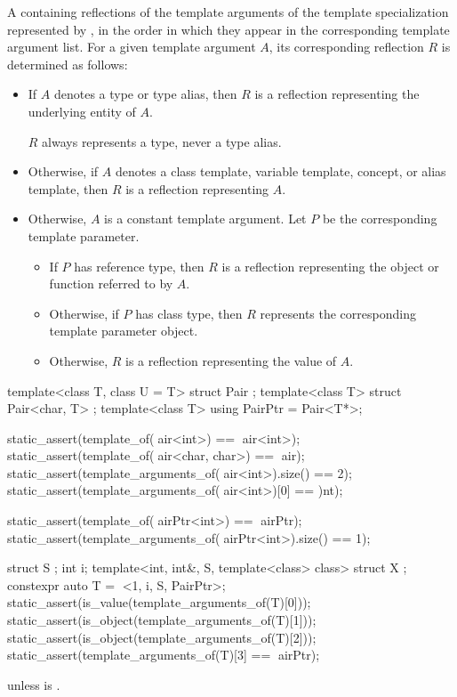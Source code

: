 \begin{itemdescr}
\pnum
\returns
A  containing reflections
of the template arguments
of the template specialization represented by ,
in the order in which they appear in the corresponding template argument list.
For a given template argument $A$,
its corresponding reflection $R$ is determined as follows:
\begin{itemize}
\item
  If $A$ denotes a type or type alias,
  then $R$ is a reflection representing the underlying entity of $A$.
  \begin{note}
  $R$ always represents a type, never a type alias.
  \end{note}
\item
  Otherwise, if $A$ denotes a
  class template,
  variable template,
  concept, or
  alias template,
  then $R$ is a reflection representing $A$.
\item
  Otherwise, $A$ is a constant template argument.
  Let $P$ be the corresponding template parameter.
  \begin{itemize}
  \item
    If $P$ has reference type,
    then $R$ is a reflection
    representing the object or function referred to by $A$.
  \item
    Otherwise, if $P$ has class type,
    then $R$ represents the corresponding template parameter object.
  \item
    Otherwise, $R$ is a reflection representing the value of $A$.
  \end{itemize}
\end{itemize}
\begin{example}
\begin{codeblock}
template<class T, class U = T> struct Pair { };
template<class T> struct Pair<char, T> { };
template<class T> using PairPtr = Pair<T*>;

static_assert(template_of(^^Pair<int>) == ^^Pair<int>);
static_assert(template_of(^^Pair<char, char>) == ^^Pair);
static_assert(template_arguments_of(^^Pair<int>).size() == 2);
static_assert(template_arguments_of(^^Pair<int>)[0] == ^^int);

static_assert(template_of(^^PairPtr<int>) == ^^PairPtr);
static_assert(template_arguments_of(^^PairPtr<int>).size() == 1);

struct S { };
int i;
template<int, int&, S, template<class> class>
  struct X { };
constexpr auto T = ^^X<1, i, S{}, PairPtr>;
static_assert(is_value(template_arguments_of(T)[0]));
static_assert(is_object(template_arguments_of(T)[1]));
static_assert(is_object(template_arguments_of(T)[2]));
static_assert(template_arguments_of(T)[3] == ^^PairPtr);
\end{codeblock}
\end{example}

\pnum
\throws
{} unless
 is .
\end{itemdescr}


